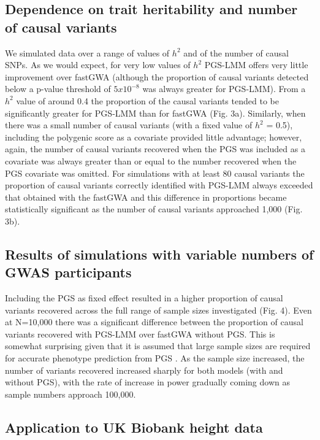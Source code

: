 \documentclass[doublespacing]{bmcart}
\begin{document}
\subsection*{Dependence on trait heritability and number of causal variants}
We simulated data over a range of values of $h^2$ and of the number of causal SNPs. As we would expect, for very low values of $h^2$ PGS-LMM offers very little improvement over fastGWA (although the proportion of causal variants detected below a p-value threshold of $5x10^{-8}$ was always greater for PGS-LMM). From a $h^2$ value of around 0.4 the proportion of the causal variants tended to be significantly greater for PGS-LMM than for fastGWA (Fig. 3a). Similarly, when there was a small number of causal variants (with a fixed value of $h^2$ = 0.5), including the polygenic score as a covariate provided little advantage; however, again, the number of causal variants recovered when the PGS was included as a covariate was always greater than or equal to the number recovered when the PGS covariate was omitted. For simulations with at least 80 causal variants the proportion of causal variants correctly identified with PGS-LMM always exceeded that obtained with the fastGWA and this difference in proportions became statistically significant as the number of causal variants approached 1,000 (Fig. 3b).

\subsection*{Results of simulations with variable numbers of GWAS participants}
Including the PGS as fixed effect resulted in a higher proportion of causal variants recovered across the full range of sample sizes investigated (Fig. 4). Even at N=10,000 there was a significant difference between the proportion of causal variants recovered with PGS-LMM over fastGWA without PGS. This is somewhat surprising given that it is assumed that large sample sizes are required for accurate phenotype prediction from PGS \cite{dudbridge2013power}. As the sample size increased, the number of variants recovered increased sharply for both models (with and without PGS), with the rate of increase in power gradually coming down as sample numbers approach 100,000. 

\subsection*{Application to UK Biobank height data} 
\end{document}
